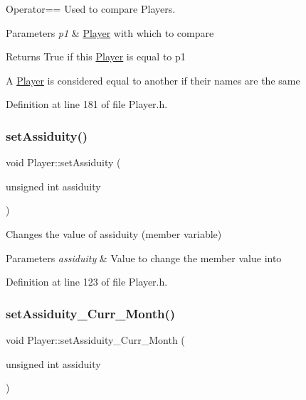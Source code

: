 Operator== Used to compare Players. 


\begin{DoxyParams}{Parameters}
{\em p1} & \hyperlink{class_player}{Player} with which to compare \\
\hline
\end{DoxyParams}
\begin{DoxyReturn}{Returns}
True if this \hyperlink{class_player}{Player} is equal to p1
\end{DoxyReturn}
A \hyperlink{class_player}{Player} is considered equal to another if their names are the same 

Definition at line 181 of file Player.\+h.

\hypertarget{class_player_a7e5ebb8fa4bc30bf04bad367a195864b}{}\label{class_player_a7e5ebb8fa4bc30bf04bad367a195864b} 
\subsubsection{\texorpdfstring{set\+Assiduity()}{setAssiduity()}}
{\footnotesize\ttfamily void Player\+::set\+Assiduity (\begin{DoxyParamCaption}\item[{unsigned int}]{assiduity }\end{DoxyParamCaption})\hspace{0.3cm}{\ttfamily [inline]}}



Changes the value of assiduity (member variable) 


\begin{DoxyParams}{Parameters}
{\em assiduity} & Value to change the member value into \\
\hline
\end{DoxyParams}


Definition at line 123 of file Player.\+h.

\hypertarget{class_player_a705ed15f41e065c7b03ad4ad1cb5ab91}{}\label{class_player_a705ed15f41e065c7b03ad4ad1cb5ab91} 
\subsubsection{\texorpdfstring{set\+Assiduity\+\_\+\+Curr\+\_\+\+Month()}{setAssiduity\_Curr\_Month()}}
{\footnotesize\ttfamily void Player\+::set\+Assiduity\+\_\+\+Curr\+\_\+\+Month (\begin{DoxyParamCaption}\item[{unsigned int}]{assiduity }\end{DoxyParamCaption})\hspace{0.3cm}{\ttfamily [inline]}}



